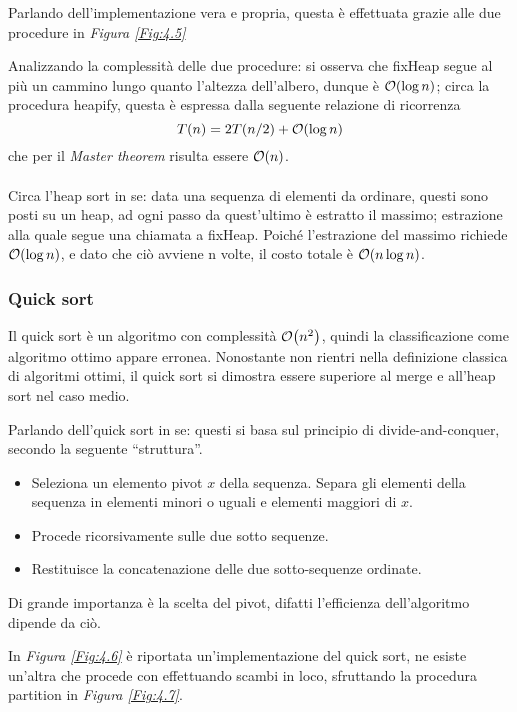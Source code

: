 \documentclass{subfiles}
\begin{document}
\noindent Parlando dell'implementazione vera e propria, questa è effettuata grazie alle due procedure in \emph{Figura \ref{Fig:4.5}}


\noindent Analizzando la complessità delle due procedure: si osserva che fixHeap segue al più un cammino lungo quanto l'altezza dell'albero, dunque è \(\order{\log n}\);
circa la procedura heapify, questa è espressa dalla seguente relazione di ricorrenza
\[
    T(n) = 2 T(n / 2) + \order{\log n}
\]
che per il \emph{Master theorem} risulta essere \(\order{n}\).
\\ \\
\noindent Circa l'heap sort in se: data una sequenza di elementi da ordinare, questi sono posti su un heap, ad ogni passo da quest'ultimo è estratto il massimo;
estrazione alla quale segue una chiamata a fixHeap. Poiché l'estrazione del massimo richiede \(\order{\log n}\), e dato che ciò avviene n volte,
il costo totale è \(\order{n \log n}\).

\subsubsection{Quick sort}
Il quick sort è un algoritmo con complessità \(\order{n^{2}}\), quindi la classificazione come algoritmo ottimo appare erronea.
Nonostante non rientri nella definizione classica di algoritmi ottimi, il quick sort si dimostra essere superiore al merge e all'heap sort nel caso medio.

Parlando dell'quick sort in se: questi si basa sul principio di divide-and-conquer, secondo la seguente ``struttura''.
\begin{itemize}
    \item Seleziona un elemento pivot \(x\) della sequenza. Separa gli elementi della sequenza in elementi minori o uguali e elementi maggiori di \(x\).
    \item Procede ricorsivamente sulle due sotto sequenze.
    \item Restituisce la concatenazione delle due sotto-sequenze ordinate.
\end{itemize}

\begin{Note*}
    Di grande importanza è la scelta del pivot, difatti l'efficienza dell'algoritmo dipende da ciò.
\end{Note*}

\noindent In \emph{Figura \ref{Fig:4.6}} è riportata un'implementazione del quick sort, ne esiste un'altra che procede con effettuando scambi in loco,
sfruttando la procedura partition in \emph{Figura \ref{Fig:4.7}}.


\end{document}
